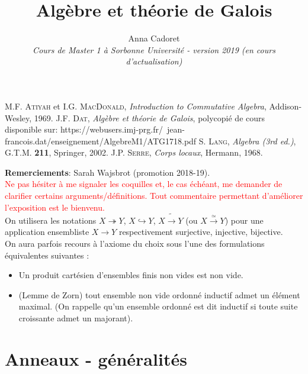 \documentclass[a4paper, oneside, 12pt]{book}
\title{Algèbre et théorie de Galois}
\author{Anna Cadoret \\
\textit{Cours de Master 1 à Sorbonne Université - version 2019 (en cours
d'actualisation)}}
\begin{document}
\maketitle
\tableofcontents

\begin{thebibliography}{99}
 M.F. \textsc{Atiyah} et I.G. \textsc{MacDonald},
  {\it Introduction to Commutative Algebra}, Addison-Wesley,  1969.
 J.F. \textsc{Dat}, {\it Algèbre et théorie de Galois}, polycopié de cours disponible sur: https://webusers.imj-prg.fr/~jean-francois.dat/enseignement/AlgebreM1/ATG1718.pdf
 S. \textsc{Lang},
  {\it Algebra (3rd ed.)}, G.T.M. \textbf{211}, Springer, 2002.
 J.P. \textsc{Serre},
  {\it Corps locaux}, Hermann, 1968.
\end{thebibliography}

 \textbf{Remerciements}: Sarah Wajsbrot (promotion 2018-19).\\

\textcolor{red}{Ne pas hésiter à me signaler les coquilles et, le cas échéant, me demander de clarifier  certains arguments/définitions. Tout  commentaire permettant d'améliorer l'exposition est le bienvenu.}\\

 On utilisera les notations $X\twoheadrightarrow Y$, $X\hookrightarrow Y$, $X\tilde{\rightarrow} Y$ (ou $X\stackrel{\simeq}{\rightarrow} Y$) pour une application ensembliste $X\rightarrow Y$ respectivement  surjective, injective, bijective.\\


  On aura parfois recours à l'axiome du choix sous l'une des formulations équivalentes suivantes :
 \begin{itemize}
 \item Un produit cartésien d'ensembles finis non vides est non vide.
 \item (Lemme de Zorn) tout ensemble non vide ordonné inductif admet un élément maximal. (On rappelle qu'un ensemble ordonné est dit inductif si toute suite croissante admet un majorant).
 \end{itemize}

\part{Anneaux - généralités}








\end{document}
